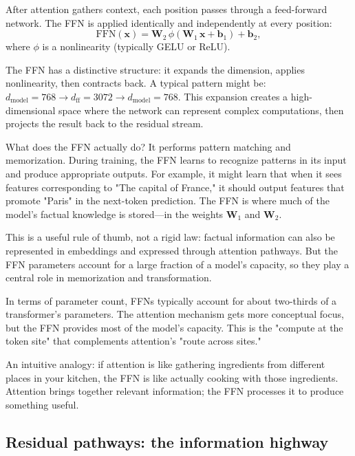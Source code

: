 After attention gathers context, each position passes through a feed-forward network. The FFN is applied identically and independently at every position:
\begin{equation}
\mathrm{FFN}(\mathbf{x}) = \mathbf{W}_2\,\phi(\mathbf{W}_1\,\mathbf{x} + \mathbf{b}_1)+\mathbf{b}_2,
\end{equation}
where $\phi$ is a nonlinearity (typically GELU or ReLU).

The FFN has a distinctive structure: it expands the dimension, applies nonlinearity, then contracts back. A typical pattern might be: $d_{\text{model}}=768 \rightarrow d_{\text{ff}}=3072 \rightarrow d_{\text{model}}=768$. This expansion creates a high-dimensional space where the network can represent complex computations, then projects the result back to the residual stream.

What does the FFN actually do? It performs pattern matching and memorization. During training, the FFN learns to recognize patterns in its input and produce appropriate outputs. For example, it might learn that when it sees features corresponding to "The capital of France," it should output features that promote "Paris" in the next-token prediction. The FFN is where much of the model's factual knowledge is stored---in the weights $\mathbf{W}_1$ and $\mathbf{W}_2$.

This is a useful rule of thumb, not a rigid law: factual information can also be represented in embeddings and expressed through attention pathways. But the FFN parameters account for a large fraction of a model's capacity, so they play a central role in memorization and transformation.

In terms of parameter count, FFNs typically account for about two-thirds of a transformer's parameters. The attention mechanism gets more conceptual focus, but the FFN provides most of the model's capacity. This is the "compute at the token site" that complements attention's "route across sites."

An intuitive analogy: if attention is like gathering ingredients from different places in your kitchen, the FFN is like actually cooking with those ingredients. Attention brings together relevant information; the FFN processes it to produce something useful.

\subsection{Residual pathways: the information highway}
\label{sec:residual_layernorm}

